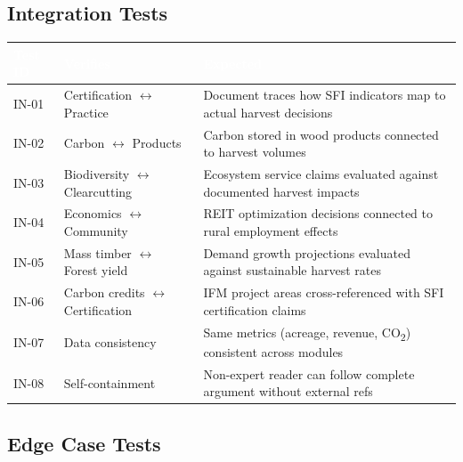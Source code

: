 \documentclass[11pt,letterpaper]{article}
\newcommand{\tableheader}[1]{\textbf{\sffamily\textcolor{white}{#1}}}
\begin{document}
\subsection{Integration Tests}

\begin{center}
\begin{tabularx}{\textwidth}{C{1.5cm}L{4cm}X}
\toprule
{}
\tableheader{Test ID} & \tableheader{Verifies} & \tableheader{Expected} \\
\midrule
IN-01 & Certification $\leftrightarrow$ Practice & Document traces how SFI indicators map to actual harvest decisions \\
IN-02 & Carbon $\leftrightarrow$ Products & Carbon stored in wood products connected to harvest volumes \\
IN-03 & Biodiversity $\leftrightarrow$ Clearcutting & Ecosystem service claims evaluated against documented harvest impacts \\
IN-04 & Economics $\leftrightarrow$ Community & REIT optimization decisions connected to rural employment effects \\
IN-05 & Mass timber $\leftrightarrow$ Forest yield & Demand growth projections evaluated against sustainable harvest rates \\
IN-06 & Carbon credits $\leftrightarrow$ Certification & IFM project areas cross-referenced with SFI certification claims \\
IN-07 & Data consistency & Same metrics (acreage, revenue, CO\textsubscript{2}) consistent across modules \\
IN-08 & Self-containment & Non-expert reader can follow complete argument without external refs \\
\bottomrule
\end{tabularx}
\end{center}

\subsection{Edge Case Tests}
\end{document}
